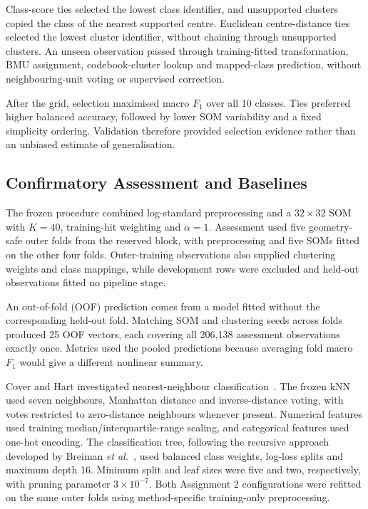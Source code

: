 Class-score ties selected the lowest class identifier, and unsupported clusters copied the class of the nearest supported centre. Euclidean centre-distance ties selected the lowest cluster identifier, without chaining through unsupported clusters. An unseen observation passed through training-fitted transformation, BMU assignment, codebook-cluster lookup and mapped-class prediction, without neighbouring-unit voting or supervised correction.

After the grid, selection maximised macro $F_1$ over all 10 classes. Ties preferred higher balanced accuracy, followed by lower SOM variability and a fixed simplicity ordering. Validation therefore provided selection evidence rather than an unbiased estimate of generalisation.

\subsection{Confirmatory Assessment and Baselines}

The frozen procedure combined log-standard preprocessing and a $32\times32$ SOM with $K=40$, training-hit weighting and $\alpha=1$. Assessment used five geometry-safe outer folds from the reserved block, with preprocessing and five SOMs fitted on the other four folds. Outer-training observations also supplied clustering weights and class mappings, while development rows were excluded and held-out observations fitted no pipeline stage.

An out-of-fold (OOF) prediction comes from a model fitted without the corresponding held-out fold. Matching SOM and clustering seeds across folds produced 25 OOF vectors, each covering all 206,138 assessment observations exactly once. Metrics used the pooled predictions because averaging fold macro $F_1$ would give a different nonlinear summary.

Cover and Hart investigated nearest-neighbour classification~\cite{cover1967}. The frozen kNN used seven neighbours, Manhattan distance and inverse-distance voting, with votes restricted to zero-distance neighbours whenever present. Numerical features used training median/interquartile-range scaling, and categorical features used one-hot encoding. The classification tree, following the recursive approach developed by Breiman \emph{et al.}~\cite{breiman1984}, used balanced class weights, log-loss splits and maximum depth 16. Minimum split and leaf sizes were five and two, respectively, with pruning parameter $3\times10^{-7}$. Both Assignment 2 configurations were refitted on the same outer folds using method-specific training-only preprocessing.


